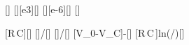 [\V]
[\kilo\ohm][e3][\ohm]
[\micro\farad][e-6][\farad]
[\V]

[R\,C]{\ResX*\CapX}[\s]
[]{\UoX/\ResX}[\A]
[]{\UaX/\ResX}[\A]
[\Delta V_0-\Delta V_C]{\UoX-\UaX}[\V]
[R\,C\,\ln{}]{\ResX*\CapX*ln(\UoX/\UaX)}[\s]
